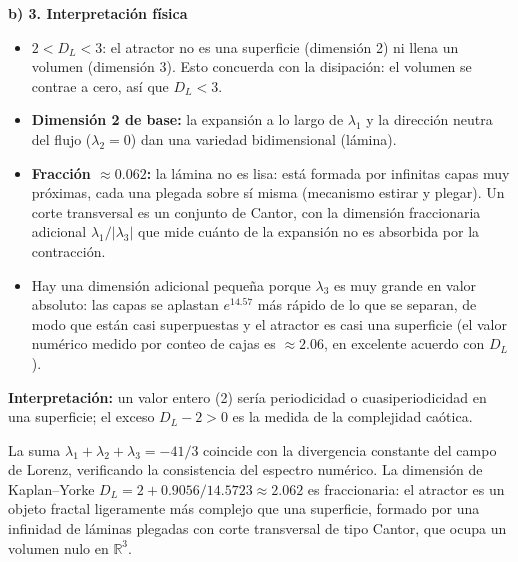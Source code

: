 \documentclass[11pt,a4paper]{article}
\newenvironment{solucion}[1][Solución Detallada]{%
    \vspace{1.5mm}%
    \noindent{\large\textbf{Solución:}}\par\vspace{1.5mm}%
}{%
    \par\vspace{3mm}%
}
\newenvironment{conclusion}[1][Interpretación Dinámica y Conclusión]{%
    \vspace{2mm}%
    \noindent{\large\textbf{Conclusión:}}\par\vspace{1.5mm}%
}{%
    \par\vspace{3mm}%
}
\begin{document}
\begin{solucion}
\textbf{\large b) 3. Interpretación física}
\begin{itemize}[leftmargin=2em]
    \item $2 < D_L < 3$: el atractor no es una superficie (dimensión 2) ni llena un volumen (dimensión 3). Esto concuerda con la disipación: el volumen se contrae a cero, así que $D_L < 3$.
    \item \textbf{Dimensión 2 de base:} la expansión a lo largo de $\lambda_1$ y la dirección neutra del flujo ($\lambda_2 = 0$) dan una variedad bidimensional (lámina).
    \item \textbf{Fracción $\approx 0.062$:} la lámina no es lisa: está formada por infinitas capas muy próximas, cada una plegada sobre sí misma (mecanismo estirar y plegar). Un corte transversal es un conjunto de Cantor, con la dimensión fraccionaria adicional $\lambda_1/|\lambda_3|$ que mide cuánto de la expansión no es absorbida por la contracción.
    \item Hay una dimensión adicional pequeña porque $\lambda_3$ es muy grande en valor absoluto: las capas se aplastan $e^{14.57}$ más rápido de lo que se separan, de modo que están casi superpuestas y el atractor es casi una superficie (el valor numérico medido por conteo de cajas es $\approx 2.06$, en excelente acuerdo con $D_L$).
\end{itemize}
\textbf{Interpretación:} un valor entero (2) sería periodicidad o cuasiperiodicidad en una superficie; el exceso $D_L - 2 > 0$ es la medida de la complejidad caótica.

\end{solucion}

\begin{conclusion}
La suma $\lambda_1 + \lambda_2 + \lambda_3 = -41/3$ coincide con la divergencia constante del campo de Lorenz, verificando la consistencia del espectro numérico. La dimensión de Kaplan--Yorke $D_L = 2 + 0.9056/14.5723 \approx 2.062$ es fraccionaria: el atractor es un objeto fractal ligeramente más complejo que una superficie, formado por una infinidad de láminas plegadas con corte transversal de tipo Cantor, que ocupa un volumen nulo en $\mathbb{R}^3$.
\end{conclusion}

\vspace{5mm}
\end{document}
